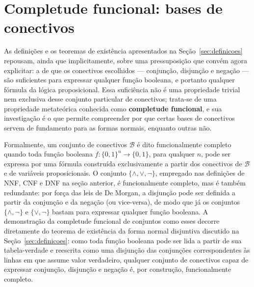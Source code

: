 \documentclass[12pt,a4paper,oneside]{report}
\theoremstyle{tituloplain}
\theoremstyle{titulodef}
\begin{document}
\section{Completude funcional: bases de conectivos}\label{sec:completude}

As definições e os teoremas de existência apresentados na Seção~\ref{sec:definicoes} repousam, ainda que implicitamente, sobre uma pressuposição que convém agora explicitar: a de que os conectivos escolhidos — conjunção, disjunção e negação — são suficientes para expressar qualquer função booleana, e portanto qualquer fórmula da lógica proposicional. Essa suficiência não é uma propriedade trivial nem exclusiva desse conjunto particular de conectivos; trata-se de uma propriedade metateórica conhecida como \textbf{completude funcional}, e sua investigação é o que permite compreender por que certas bases de conectivos servem de fundamento para as formas normais, enquanto outras não.
 
Formalmente, um conjunto de conectivos $\mathcal{B}$ é dito funcionalmente completo quando toda função booleana $f : \{0,1\}^n \rightarrow \{0,1\}$, para qualquer $n$, pode ser expressa por uma fórmula construída exclusivamente a partir dos conectivos de $\mathcal{B}$ e de variáveis proposicionais. O conjunto $\{\wedge, \vee, \neg\}$, empregado nas definições de NNF, CNF e DNF na seção anterior, é funcionalmente completo, mas é também redundante: por força das leis de De Morgan, a disjunção pode ser definida a partir da conjunção e da negação (ou vice-versa), de modo que já os conjuntos $\{\wedge, \neg\}$ e $\{\vee, \neg\}$ bastam para expressar qualquer função booleana. A demonstração da completude funcional de conjuntos como esses decorre diretamente do teorema de existência da forma normal disjuntiva discutido na Seção~\ref{sec:definicoes}: como toda função booleana pode ser lida a partir de sua tabela-verdade e reescrita como uma disjunção das conjunções correspondentes às linhas em que assume valor verdadeiro, qualquer conjunto de conectivos capaz de expressar conjunção, disjunção e negação é, por construção, funcionalmente completo.
 
\end{document}
